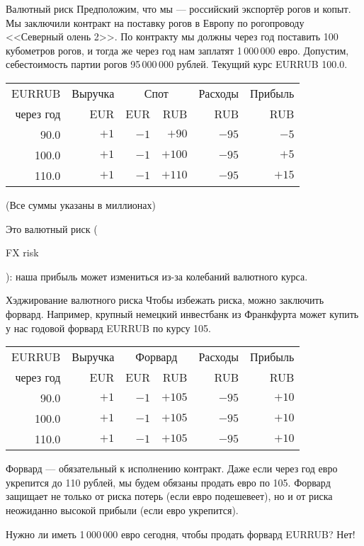 \documentclass{beamer}
\newcommand{\en}[1]{\begin{otherlanguage}{english}#1\end{otherlanguage}}
\begin{document}
\begin{frame}{Валютный риск}
\justify
Предположим, что мы --- российский экспортёр рогов и копыт. Мы заключили контракт на поставку рогов в Европу по рогопроводу <<Северный олень 2>>. По контракту мы должны через год поставить 100 кубометров рогов, и тогда же через год нам заплатят 1\,000\,000 евро. Допустим, себестоимость партии рогов 95\,000\,000 рублей. Текущий курс EURRUB 100.0.

\justify
\centering
\begin{tabular}{r|r|r|r|r|r}
EURRUB      & Выручка & \multicolumn{2}{c|}{Спот} & Расходы & Прибыль \\
\cline{3-4}
через год   & EUR     & EUR    & RUB              & RUB     & RUB   \\ \hline
90.0        & $+1$  & $-1$ & $+90$          & $-95$ & $-5$ \\
100.0        & $+1$  & $-1$ & $+100$          & $-95$ & $+5$ \\
110.0        & $+1$  & $-1$ & $+110$          & $-95$ & $+15$
\end{tabular}
(Все суммы указаны в миллионах)

\justify
Это \alert{валютный риск} (\en{FX risk}): наша прибыль может измениться из-за колебаний валютного курса.
\end{frame}



\begin{frame}{Хэджирование валютного риска}
\justify
Чтобы избежать риска, можно заключить форвард. Например, крупный немецкий инвестбанк из 
Франкфурта может купить у нас годовой форвард EURRUB по курсу 105.

\justify
\centering
\begin{tabular}{r|r|r|r|r|r}
EURRUB      & Выручка & \multicolumn{2}{c|}{Форвард} & Расходы & Прибыль \\
\cline{3-4}
через год   & EUR     & EUR    & RUB              & RUB     & RUB   \\ \hline
90.0          & $+1$  & $-1$ & $+105$          & $-95$ & $+10$ \\
100.0        & $+1$  & $-1$ & $+105$          & $-95$ & $+10$ \\
110.0        & $+1$  & $-1$ & $+105$          & $-95$ & $+10$
\end{tabular}

\justify
Форвард --- обязательный к исполнению контракт. Даже если через год евро укрепится до 
110 рублей, мы будем обязаны продать евро по 105. Форвард защищает не только от риска 
потерь (если евро подешевеет), но и от риска неожиданно высокой прибыли (если евро 
укрепится).

\justify
Нужно ли иметь 1\,000\,000 евро сегодня, чтобы продать форвард EURRUB? Нет!
\end{frame}
\end{document}
